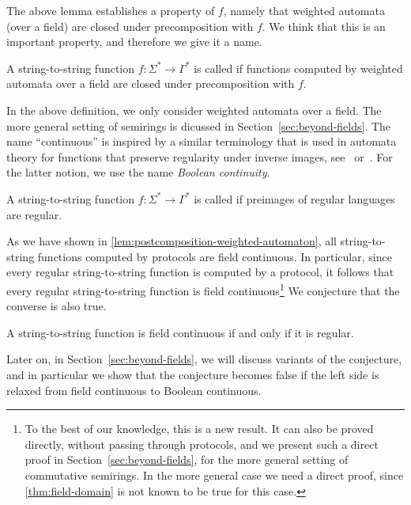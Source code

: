 The above lemma establishes a property of $f$, namely that weighted automata
(over a field) are closed under precomposition with $f$. We think that this is
an important property, and therefore we give it a name.


\begin{definition}
    \label{def:weighted-continuity}
    A string-to-string function $f : \Sigma^* \to \Gamma^*$ is called  if functions computed by weighted automata over a field are closed under precomposition with $f$.
\end{definition}

In the above definition, we only consider weighted automata over a field. The more general setting of semirings is dicussed in Section~\ref{sec:beyond-fields}.
The name ``continuous'' is inspired by a similar terminology that is used in automata theory for functions that preserve regularity under inverse images, see~\cite[Theorem 4.1]{PinSilva05} or~\cite[Footnote 2]{continuity20}.  For the latter notion, we use the name \emph{Boolean continuity}.

\begin{definition}
    A string-to-string function $f : \Sigma^* \to \Gamma^*$ is called  if preimages of regular languages are regular.
\end{definition}

As we have shown in \cref{lem:postcomposition-weighted-automaton}, all
string-to-string functions computed by protocols are field continuous. In
particular, since every regular string-to-string function is computed by a
protocol, it follows that every regular string-to-string function is field
continuous\footnote{To the best of our knowledge, this is a new result. It can
also be proved directly, without passing through protocols, and we present such
a direct proof in Section~\ref{sec:beyond-fields}, for the more general setting
of commutative semirings. In the more general case we need a direct proof,
since \cref{thm:field-domain} is not known to be true for this case.} We
conjecture that the converse is also true.

\begin{conjecture}\label{conj:regular-continuous}
    A string-to-string function is field continuous if and only if it is regular.
\end{conjecture}

Later on, in Section~\ref{sec:beyond-fields}, we will discuss variants of the conjecture, and in particular we show that the conjecture becomes false if the left side is relaxed from field continuous to Boolean continuous.

